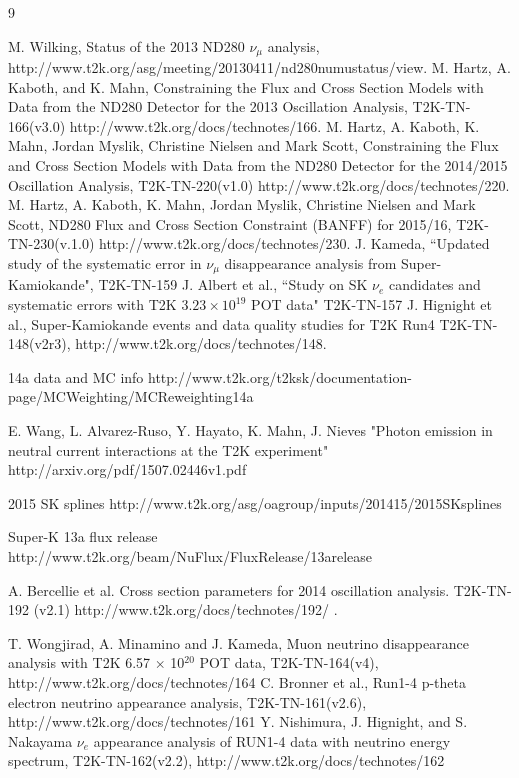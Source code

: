 \begin{thebibliography}{9}
%
%

  M. Wilking,
  Status of the 2013 ND280 $\nu_{\mu}$ analysis,\\
  http://www.t2k.org/asg/meeting/20130411/nd280numustatus/view.
  M. Hartz, A. Kaboth, and K. Mahn,
  Constraining the Flux and Cross Section Models with Data from the
  ND280 Detector for the 2013 Oscillation Analysis,
  T2K-TN-166(v3.0)
  http://www.t2k.org/docs/technotes/166.
  M. Hartz, A. Kaboth, K. Mahn, Jordan Myslik, Christine Nielsen and Mark Scott,
  Constraining the Flux and Cross Section Models with Data from the
  ND280 Detector for the 2014/2015 Oscillation Analysis,
  T2K-TN-220(v1.0)
  http://www.t2k.org/docs/technotes/220.
  M. Hartz, A. Kaboth, K. Mahn, Jordan Myslik, Christine Nielsen and Mark Scott,
 ND280 Flux and Cross Section Constraint (BANFF) for 2015/16,
  T2K-TN-230(v.1.0)
  http://www.t2k.org/docs/technotes/230.
J. Kameda,
``Updated study of the systematic error in $\nu_{\mu}$ disappearance analysis from Super-Kamiokande",
T2K-TN-159
J. Albert et al.,
``Study on SK $\nu_e$ candidates and systematic errors with T2K $3.23 \times 10^{19}$ POT data"
T2K-TN-157
   J. Hignight et al.,
   Super-Kamiokande events and data quality studies for T2K Run4
   T2K-TN-148(v2r3),
   http://www.t2k.org/docs/technotes/148.

%
%

   14a data and MC info
   http://www.t2k.org/t2ksk/documentation-page/MCWeighting/MCReweighting14a

   E. Wang, L. Alvarez-Ruso, Y. Hayato, K. Mahn, J. Nieves
   "Photon emission in neutral current interactions at the T2K experiment"
   http://arxiv.org/pdf/1507.02446v1.pdf

   2015 SK splines
   http://www.t2k.org/asg/oagroup/inputs/201415/2015SKsplines

   Super-K 13a flux release
   http://www.t2k.org/beam/NuFlux/FluxRelease/13arelease
   
   A. Bercellie et al.
   Cross section parameters for 2014 oscillation analysis.
   T2K-TN-192 (v2.1)
   http://www.t2k.org/docs/technotes/192/ .
%
%
%


  T. Wongjirad, A. Minamino and J. Kameda,
  Muon neutrino disappearance analysis with T2K 6.57 $\times$ 10$^{20}$ POT data,
  T2K-TN-164(v4),
  http://www.t2k.org/docs/technotes/164
  C. Bronner et al.,
  Run1-4 p-theta electron neutrino appearance analysis,
  T2K-TN-161(v2.6),
  http://www.t2k.org/docs/technotes/161
  Y. Nishimura, J. Hignight, and S. Nakayama
  $\nu_e$ appearance analysis of RUN1-4 data with neutrino energy spectrum,
  T2K-TN-162(v2.2),
  http://www.t2k.org/docs/technotes/162
  

\end{thebibliography}
